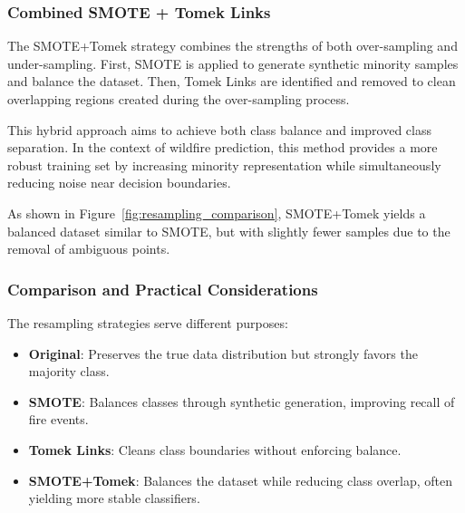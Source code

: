 \subsubsection{Combined SMOTE + Tomek Links}

The SMOTE+Tomek strategy combines the strengths of both over-sampling and under-sampling. First, SMOTE is applied to generate synthetic minority samples and balance the dataset. Then, Tomek Links are identified and removed to clean overlapping regions created during the over-sampling process.

This hybrid approach aims to achieve both class balance and improved class separation. In the context of wildfire prediction, this method provides a more robust training set by increasing minority representation while simultaneously reducing noise near decision boundaries.

As shown in Figure~\ref{fig:resampling_comparison}, SMOTE+Tomek yields a balanced dataset similar to SMOTE, but with slightly fewer samples due to the removal of ambiguous points.

\subsubsection{Comparison and Practical Considerations}

The resampling strategies serve different purposes:
\begin{itemize}
  \item \textbf{Original}: Preserves the true data distribution but strongly favors the majority class.
  \item \textbf{SMOTE}: Balances classes through synthetic generation, improving recall of fire events.
  \item \textbf{Tomek Links}: Cleans class boundaries without enforcing balance.
  \item \textbf{SMOTE+Tomek}: Balances the dataset while reducing class overlap, often yielding more stable classifiers.
\end{itemize}
